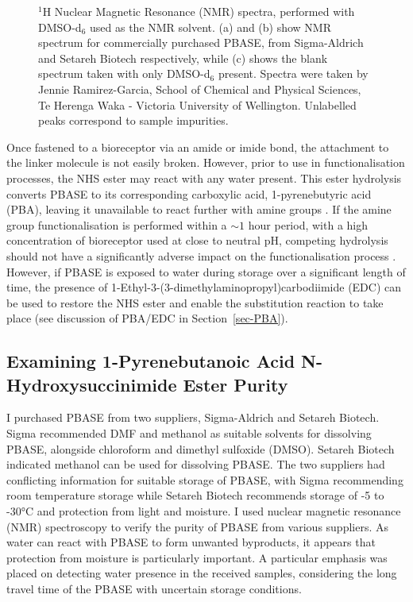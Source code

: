 \documentclass[
  a4paper,
]{scrbook}
\begin{document}
\begin{figure}
\begin{minipage}[t]{\linewidth}
{{}

}

\subcaption{\label{fig-dmso-nmr}}
\end{minipage}%

\caption{\label{fig-pbase-nmr}\(^{1}\)H Nuclear Magnetic Resonance (NMR)
spectra, performed with DMSO-d\(_6\) used as the NMR solvent. (a) and
(b) show NMR spectrum for commercially purchased PBASE, from
Sigma-Aldrich and Setareh Biotech respectively, while (c) shows the
blank spectrum taken with only DMSO-d\(_6\) present. Spectra were taken
by Jennie Ramirez-Garcia, School of Chemical and Physical Sciences, Te
Herenga Waka - Victoria University of Wellington. Unlabelled peaks
correspond to sample impurities.}

\end{figure}

Once fastened to a bioreceptor via an amide or imide bond, the
attachment to the linker molecule is not easily broken. However, prior
to use in functionalisation processes, the NHS ester may react with any
water present. This ester hydrolysis converts PBASE to its corresponding
carboxylic acid, 1-pyrenebutyric acid (PBA), leaving it unavailable to
react further with amine groups
\autocite{Hermanson2013-3,Hermanson2013-5,Mishyn2022}. If the amine
group functionalisation is performed within a \(\sim1\) hour period,
with a high concentration of bioreceptor used at close to neutral pH,
competing hydrolysis should not have a significantly adverse impact on
the functionalisation process \autocite{Hermanson2013-3}. However, if
PBASE is exposed to water during storage over a significant length of
time, the presence of 1-Ethyl-3-(3-dimethylaminopropyl)carbodiimide
(EDC) can be used to restore the NHS ester and enable the substitution
reaction to take place (see discussion of PBA/EDC in
Section~\ref{sec-PBA}).

\hypertarget{sec-PBASE-purity}{%
\subsection{Examining 1-Pyrenebutanoic Acid N-Hydroxysuccinimide Ester
Purity}\label{sec-PBASE-purity}}

I purchased PBASE from two suppliers, Sigma-Aldrich and Setareh Biotech.
Sigma recommended DMF and methanol as suitable solvents for dissolving
PBASE, alongside chloroform and dimethyl sulfoxide (DMSO). Setareh
Biotech indicated methanol can be used for dissolving PBASE. The two
suppliers had conflicting information for suitable storage of PBASE,
with Sigma recommending room temperature storage while Setareh Biotech
recommends storage of -5 to -30°C and protection from light and
moisture. I used nuclear magnetic resonance (NMR) spectroscopy to verify
the purity of PBASE from various suppliers. As water can react with
PBASE to form unwanted byproducts, it appears that protection from
moisture is particularly important. A particular emphasis was placed on
detecting water presence in the received samples, considering the long
travel time of the PBASE with uncertain storage conditions.
\end{document}

